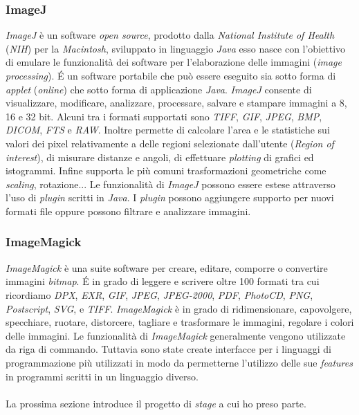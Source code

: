 \subsubsection*{ImageJ}
\label{2.1.4.8}
\emph{ImageJ} è un software \emph{open source}, prodotto dalla \emph{National Institute of Health} (\emph{NIH}) per la \emph{Macintosh}, sviluppato in linguaggio \emph{Java} esso nasce con l'obiettivo di emulare le funzionalità dei software per l'elaborazione delle immagini (\emph{image processing}). \'{E} un software portabile che può essere eseguito sia sotto forma di \emph{applet} (\emph{online}) che sotto forma di applicazione \emph{Java}. \emph{ImageJ} consente di visualizzare, modificare, analizzare, processare, salvare e stampare immagini a 8, 16 e 32 bit. Alcuni tra i formati supportati sono \emph{TIFF}, \emph{GIF}, \emph{JPEG}, \emph{BMP}, \emph{DICOM}, \emph{FTS} e \emph{RAW}. Inoltre permette di calcolare l'area e le statistiche sui valori dei pixel relativamente a delle regioni selezionate dall'utente (\emph{Region of interest}), di misurare distanze e angoli, di effettuare \emph{plotting} di grafici ed istogrammi. Infine supporta le più comuni trasformazioni geometriche come \emph{scaling}, rotazione... Le funzionalità di \emph{ImageJ} possono essere estese attraverso l'uso di \emph{plugin} scritti in \emph{Java}. I \emph{plugin} possono aggiungere supporto per nuovi formati file oppure possono filtrare e analizzare immagini.
\subsubsection*{ImageMagick}
\label{2.1.4.9}
\emph{ImageMagick} è una suite software per creare, editare, comporre o convertire immagini \emph{bitmap}. \'{E} in grado di leggere e scrivere oltre 100 formati tra cui ricordiamo \emph{DPX}, \emph{EXR}, \emph{GIF}, \emph{JPEG}, \emph{JPEG-2000}, \emph{PDF}, \emph{PhotoCD}, \emph{PNG}, \emph{Postscript}, \emph{SVG}, e \emph{TIFF}. \emph{ImageMagick} è in grado di ridimensionare, capovolgere, specchiare, ruotare, distorcere, tagliare e trasformare le immagini, regolare i colori delle immagini. Le funzionalità di \emph{ImageMagick} generalmente vengono utilizzate da riga di commando. Tuttavia sono state create interfacce per i linguaggi di programmazione più utilizzati in modo da permetterne l'utilizzo delle sue \emph{features} in programmi scritti in un linguaggio diverso.\\\\
La prossima sezione introduce il progetto di \emph{stage} a cui ho preso parte.

